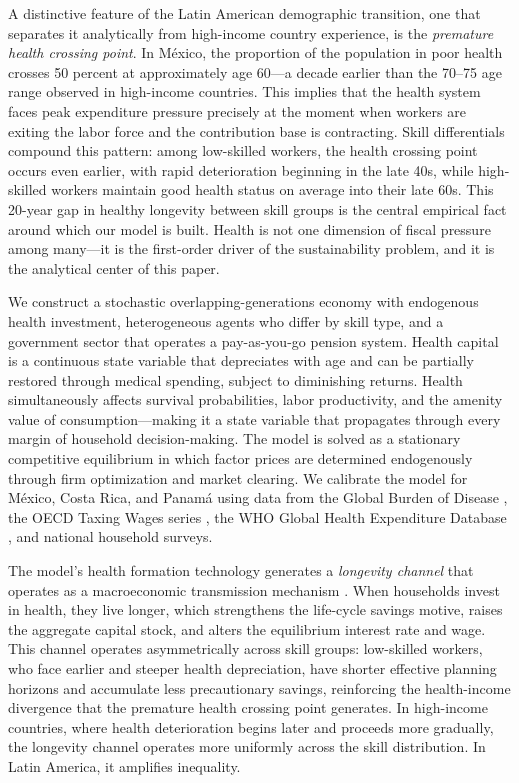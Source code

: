 \documentclass[12pt,a4paper]{article}
\begin{document}
A distinctive feature of the Latin American demographic transition, one that separates it analytically from high-income country experience, is the \textit{premature health crossing point}. In M\'exico, the proportion of the population in poor health crosses 50 percent at approximately age 60---a decade earlier than the 70--75 age range observed in high-income countries. This implies that the health system faces peak expenditure pressure precisely at the moment when workers are exiting the labor force and the contribution base is contracting. Skill differentials compound this pattern: among low-skilled workers, the health crossing point occurs even earlier, with rapid deterioration beginning in the late 40s, while high-skilled workers maintain good health status on average into their late 60s. This 20-year gap in healthy longevity between skill groups is the central empirical fact around which our model is built. Health is not one dimension of fiscal pressure among many---it is the first-order driver of the sustainability problem, and it is the analytical center of this paper.

We construct a stochastic overlapping-generations economy with endogenous health investment, heterogeneous agents who differ by skill type, and a government sector that operates a pay-as-you-go pension system. Health capital is a continuous state variable that depreciates with age and can be partially restored through medical spending, subject to diminishing returns. Health simultaneously affects survival probabilities, labor productivity, and the amenity value of consumption---making it a state variable that propagates through every margin of household decision-making. The model is solved as a stationary competitive equilibrium in which factor prices are determined endogenously through firm optimization and market clearing. We calibrate the model for M\'exico, Costa Rica, and Panam\'a using data from the Global Burden of Disease \citep{GBD2021}, the OECD Taxing Wages series \citep{OECDTaxingWages2026}, the WHO Global Health Expenditure Database \citep{WHOGHED2024}, and national household surveys.

The model's health formation technology generates a \textit{longevity channel} that operates as a macroeconomic transmission mechanism \citep{Carrasco2026}. When households invest in health, they live longer, which strengthens the life-cycle savings motive, raises the aggregate capital stock, and alters the equilibrium interest rate and wage. This channel operates asymmetrically across skill groups: low-skilled workers, who face earlier and steeper health depreciation, have shorter effective planning horizons and accumulate less precautionary savings, reinforcing the health-income divergence that the premature health crossing point generates. In high-income countries, where health deterioration begins later and proceeds more gradually, the longevity channel operates more uniformly across the skill distribution. In Latin America, it amplifies inequality.
\end{document}
